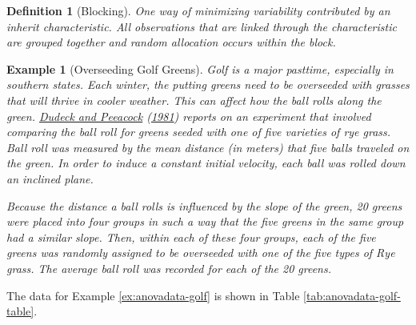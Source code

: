 \documentclass[
]{book}
\theoremstyle{plain}
\theoremstyle{mydefn}
\newtheorem{definition}{Definition}[chapter]
\theoremstyle{myexmpl}
\newtheorem{example}{Example}[chapter]
\theoremstyle{remark}
\begin{document}
\begin{definition}[Blocking]
\protect\hypertarget{def:defn-blocking}{}{\label{def:defn-blocking} {} }One way of minimizing variability contributed by an inherit characteristic. All observations that are linked through the characteristic are grouped together and random allocation occurs \emph{within} the block.
\end{definition}

\begin{example}[Overseeding Golf Greens]
\protect\hypertarget{exm:anovadata-golf}{}{\label{exm:anovadata-golf} {} }Golf is a major pasttime, especially in southern states. Each winter, the putting greens need to be overseeded with grasses that will thrive in cooler weather. This can affect how the ball rolls along the green. \protect\hyperlink{ref-Dudeck1981}{Dudeck and Peeacock} (\protect\hyperlink{ref-Dudeck1981}{1981}) reports on an experiment that involved comparing the ball roll for greens seeded with one of five varieties of rye grass. Ball roll was measured by the mean distance (in meters) that five balls traveled on the green. In order to induce a constant initial velocity, each ball was rolled down an inclined plane.

Because the distance a ball rolls is influenced by the slope of the green, 20 greens were placed into four groups in such a way that the five greens in the same group had a similar slope. Then, within each of these four groups, each of the five greens was randomly assigned to be overseeded with one of the five types of Rye grass. The average ball roll was recorded for each of the 20 greens.
\end{example}

The data for Example \ref{ex:anovadata-golf} is shown in Table \ref{tab:anovadata-golf-table}.
\end{document}
